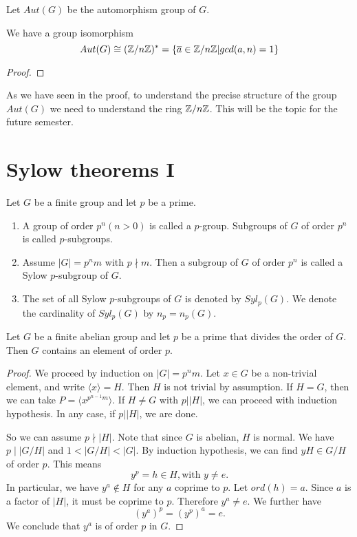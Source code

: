 Let $Aut(G)$ be the automorphism group of $G$.
\begin{thm}
    We have a group isomorphism
    \[
        Aut(G) \cong (\mathbb {Z}/n\mathbb {Z})^* = \{\overline{a} \in \mathbb {Z}/n\mathbb {Z}\vert gcd(a,n) =1\}
    \]
\end{thm}
\begin{proof}

\end{proof}

As we have seen in the proof, to understand the precise structure of the group $Aut(G)$ we need to understand the ring $\mathbb {Z}/n\mathbb {Z}$. This will be the topic for the future semester.





\section{Sylow theorems I}
\begin{defi}
    Let $G$ be a finite group and let $p$ be a prime.

    \begin{enumerate}
        \item A group of order $p^n (n > 0)$ is called a $p$-group. Subgroups of $G$ of order $p^n$ is called $p$-subgroups.
        \item Assume $|G| = p^n m$ with $p \nmid m$. Then a subgroup of $G$ of order $p^n$ is called a Sylow $p$-subgroup of $G$.
        \item The set of all Sylow $p$-subgroups of $G$ is denoted by $Syl_p(G)$. We denote the cardinality of $Syl_p(G)$ by $n_p=n_p(G)$.
    \end{enumerate}
\end{defi}

\begin{lem}
    Let $G$ be a finite abelian group and let $p$ be a prime that divides the order of $G$. Then $G$ contains an element of order $p$.
\end{lem}

\begin{proof}
    We proceed by induction on $|G|= p^{n}m$. Let $x \in G$ be a non-trivial element, and write $\langle x \rangle = H$. Then $H$ is not trivial by assumption. If $H= G$, then we can take $P= \langle x^{p^{n-1}m} \rangle $. If $H \neq G$ with $p \vert |H|$, we can proceed with induction hypothesis. In any case, if $p \vert |H|$, we are done.

    So we can assume $p \nmid |H|$. Note that since $G$ is abelian, $H$ is normal. We have $p \mid |G/H|$ and $1 < |G/H| < |G|$. By induction hypothesis, we can find $yH \in G/H$ of order $p$. This means
    \[
        y^p = h \in H, \text{with } y \neq e.
    \]
    In particular, we have $y^a \notin H$ for any $a$ coprime to $p$. Let $ord(h) = a$. Since $a$ is a factor of $|H|$, it must be coprime to $p$. Therefore $y^a \neq e$. We further have
    \[
        (y^a)^p = (y^p)^a =e.
    \]
    We conclude that $y^a$ is of order $p$ in $G$.
\end{proof}


